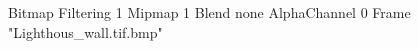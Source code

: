{Bitmap
	{Filtering 1}
	{Mipmap 1}
	{Blend none}
	{AlphaChannel 0}
	{Frame "Lighthous_wall.tif.bmp"}
}

